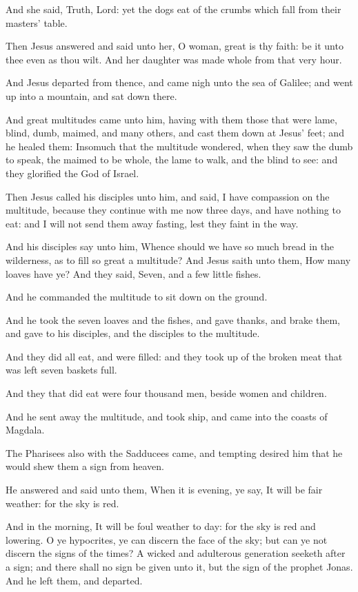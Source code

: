\Verse And she said, Truth, Lord: yet the dogs eat of the crumbs which fall from their masters' table.

\Verse Then Jesus answered and said unto her, O woman, great is thy faith: be it unto thee even as thou wilt. And her daughter was made whole from that very hour.

\Verse And Jesus departed from thence, and came nigh unto the sea of Galilee; and went up into a mountain, and sat down there.

\Verse And great multitudes came unto him, having with them those that were lame, blind, dumb, maimed, and many others, and cast them down at Jesus' feet; and he healed them: \Verse Insomuch that the multitude wondered, when they saw the dumb to speak, the maimed to be whole, the lame to walk, and the blind to see: and they glorified the God of Israel.

\Verse Then Jesus called his disciples unto him, and said, I have compassion on the multitude, because they continue with me now three days, and have nothing to eat: and I will not send them away fasting, lest they faint in the way.

\Verse And his disciples say unto him, Whence should we have so much bread in the wilderness, as to fill so great a multitude?  \Verse And Jesus saith unto them, How many loaves have ye? And they said, Seven, and a few little fishes.

\Verse And he commanded the multitude to sit down on the ground.

\Verse And he took the seven loaves and the fishes, and gave thanks, and brake them, and gave to his disciples, and the disciples to the multitude.

\Verse And they did all eat, and were filled: and they took up of the broken meat that was left seven baskets full.

\Verse And they that did eat were four thousand men, beside women and children.

\Verse And he sent away the multitude, and took ship, and came into the coasts of Magdala.


\Chapter
\Verse The Pharisees also with the Sadducees came, and tempting desired him that he would shew them a sign from heaven.

\Verse He answered and said unto them, When it is evening, ye say, It will be fair weather: for the sky is red.

\Verse And in the morning, It will be foul weather to day: for the sky is red and lowering. O ye hypocrites, ye can discern the face of the sky; but can ye not discern the signs of the times?  \Verse A wicked and adulterous generation seeketh after a sign; and there shall no sign be given unto it, but the sign of the prophet Jonas. And he left them, and departed.


